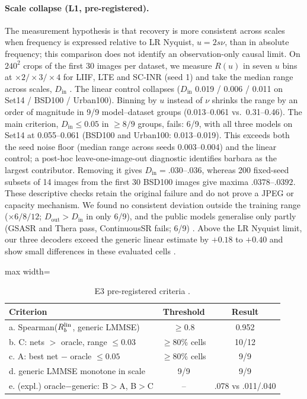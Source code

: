 \paragraph{Scale collapse (L1, pre-registered).} The measurement hypothesis is that recovery is more consistent across scales when frequency is expressed relative to LR Nyquist, $u=2s\nu$, than in absolute frequency; this comparison does not identify an observation-only causal limit. On
$240^2$ crops of the first 30 images per dataset, we measure $R(u)$ in seven
$u$ bins at $\times2/\times3/\times4$ for LIIF, LTE and SC-INR (seed 1) and
take the median range across scales, $D_{\mathrm{in}}$ . The
linear control collapses ($D_{\mathrm{in}}$ 0.019 / 0.006 / 0.011 on Set14 /
BSD100 / Urban100). Binning by $u$ instead of $\nu$ shrinks the range by an
order of magnitude in 9/9 model--dataset groups (0.013--0.061 vs.\
0.31--0.46). The main criterion, $D_{\mathrm{in}}\le0.05$ in $\ge8/9$ groups,
fails: 6/9, with all three models on Set14 at 0.055--0.061 (BSD100 and
Urban100: 0.013--0.019). This exceeds both the seed noise floor (median range
across seeds 0.003--0.004) and the linear control; a post-hoc leave-one-image-out diagnostic identifies barbara as the largest contributor. Removing it gives $D_{\mathrm{in}}=.030$--$.036$, whereas 200 fixed-seed subsets of 14 images from the first 30 BSD100 images give maxima $.0378$--$.0392$. These descriptive checks retain the original failure and do not prove a JPEG or capacity mechanism. We found no consistent deviation outside the training range
($\times6/8/12$; $D_{\mathrm{out}}>D_{\mathrm{in}}$ in only 6/9), and the
public models generalise only partly (GSASR and Thera pass, ContinuousSR
fails; 6/9) . Above the LR Nyquist limit, our three decoders
exceed the generic linear estimate by $+0.18$ to $+0.40$ and show small differences in these evaluated cells \src{L1L2}.

\begin{table}[t]\centering\small
\caption{E3 pre-registered criteria .}\label{tab:e3}
\begin{adjustbox}{max width=\linewidth}\begin{tabular}{lcc}\toprule
Criterion & Threshold & Result\\\midrule
a. Spearman($R_b^{\mathrm{lin}}$, generic LMMSE) & $\ge0.8$ & 0.952\\
b. C: nets $>$ oracle, range $\le0.03$ & $\ge80\%$ cells & 10/12\\
c. A: best net $-$ oracle $\le0.05$ & $\ge80\%$ cells & 9/9\\
d. generic LMMSE monotone in scale & 9/9 & 9/9\\
e. (expl.) oracle$-$generic: B$>$A, B$>$C & -- & .078 vs .011/.040\\
\bottomrule\end{tabular}\end{adjustbox}
\end{table}



